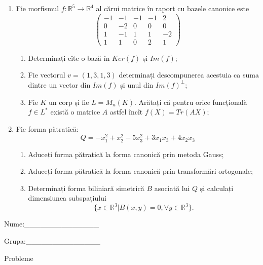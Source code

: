 \documentclass{article}
\begin{document}
\begin{enumerate}
 \item Fie morfismul $f:\mathbb{R}^5 \to \mathbb{R}^4$ al cărui matrice în raport cu bazele canonice este
$$\begin{pmatrix}
-1&-1&-1&-1&2\\
0&-2&0&0&0\\
1&-1&1&1&-2\\
1&1&0&2&1
\end{pmatrix}$$

\begin{enumerate}
\item Determinați cîte o bază în $Ker(f)$ și $Im(f)$;
\item Fie vectorul $v=(1,3,1,3)$ determinați descompunerea acestuia ca suma dintre un vector din $Im(f)$ și unul din $Im(f)^\perp$;
\item Fie $K$ un corp și fie $L=M_n(K)$. Arătați că pentru orice funcțională $f \in L^*$ există o matrice $A$ astfel încît $f(X)=Tr(AX)$;
\end{enumerate}
\item Fie forma pătratică:
$$Q= -x_1^2+x_2^2-5x_3^2+3x_1x_3+4x_2x_3$$

\begin{enumerate}
\item Aduceți forma pătratică la forma canonică prin metoda Gauss;
\item Aduceți forma pătratică la forma canonică prin transformări ortogonale;
\item Determinați forma biliniară simetrică $B$ asociată lui $Q$ și calculați dimensiunea subspațiului
$$\{x \in \mathbb{R}^3 | B(x,y)=0,\forall y \in \mathbb{R}^3\}.$$

\end{enumerate}
\end{enumerate}
\newpage
\begin{flushright}
Nume:\_\_\_\_\_\_\_\_\_\_\_\_\_\_
 
 
Grupa:\_\_\_\_\_\_\_\_\_\_\_\_\_\_
\end{flushright}
\begin{center}
\vspace{2cm}
{\Large Probleme}
\vspace{2cm}
\end{center}
\end{document}
